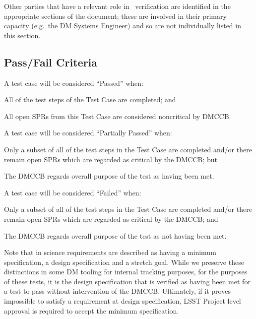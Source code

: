 Other parties that have a relevant role in \product\ verification are identified in the appropriate sections of the document; these are involved in their primary capacity (e.g.\ the DM Systems Engineer) and so are not individually listed in this section.

\subsection{Pass/Fail Criteria}

A test case will be considered ``Passed'' when:

\begin{itemize_single}
\item{All of the test steps of the Test Case are completed; and}
\item{All open SPRs from this Test Case are considered noncritical by DMCCB.}
\end{itemize_single}

A test case will be considered ``Partially Passed'' when:

\begin{itemize_single}
\item{Only a subset of all of the test steps in the Test Case are completed and/or there remain open SPRs which are regarded as critical by the DMCCB; but}
\item{The DMCCB regards overall purpose of the test as having been met.}
\end{itemize_single}

A test case will be considered ``Failed'' when:

\begin{itemize_single}
\item{Only a subset of all of the test steps in the Test Case are completed and/or there remain open SPRs which are regarded as critical by the DMCCB; and}
\item{The DMCCB regards overall purpose of the test as not having been met.}
\end{itemize_single}

Note that in  science requirements are described as having a minimum specification, a design specification and a stretch goal.
While we preserve these distinctions in some DM tooling for internal tracking purposes, for the purposes of these tests, it is the design specification that is verified as having been met for a test to pass without intervention of the DMCCB.
Ultimately, if it proves impossible to satisfy a requirement at design specification, LSST Project level approval is required to accept the minimum specification.

